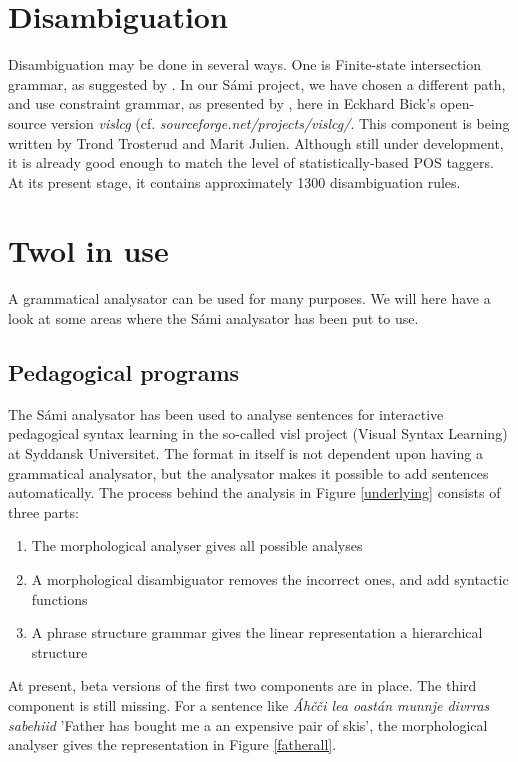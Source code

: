\documentclass[a4paper,english]{article}
\begin{document}
\section{Disambiguation}\label{disamb}

Disambiguation may be done in several ways. One is Finite-state intersection grammar, as suggested by \cite{Koskenniemi97}. In our Sámi project, we have chosen a different path, and use constraint grammar, as presented by \cite{Tapanainen96}, here in Eckhard Bick's open-source version \textit{vislcg} (cf. \textit{sourceforge.net/projects/vislcg/}. This component is being written by Trond Trosterud and Marit Julien. Although still under development, it is already good enough to match the level of statistically-based POS taggers. At its present stage, it contains approximately 1300 disambiguation rules.


\section{Twol in use}

A grammatical analysator can be used for many purposes. We will here have a look at some areas where the Sámi analysator has been put to use.

\subsection{Pedagogical programs}\label{ped}

The Sámi analysator has been used to analyse sentences for interactive pedagogical syntax learning in the so-called visl project (Visual Syntax Learning) at Syddansk Universitet. The format in itself is not dependent upon having a grammatical analysator, but the analysator makes it possible to add sentences automatically. The process behind the analysis in Figure \ref{underlying} consists of three parts:

\begin{enumerate}
\item The morphological analyser gives all possible analyses
\item A morphological disambiguator removes the incorrect ones, and add syntactic functions
\item A phrase structure grammar gives the linear representation a hierarchical structure
\end{enumerate}

At present, beta versions of the first two components are in place. The third component is still missing.
For a sentence like \textit{Áhčči lea oastán munnje divrras sabehiid} 'Father has bought me a an expensive pair of skis', the morphological analyser gives the representation in Figure \ref{fatherall}.
\end{document}
